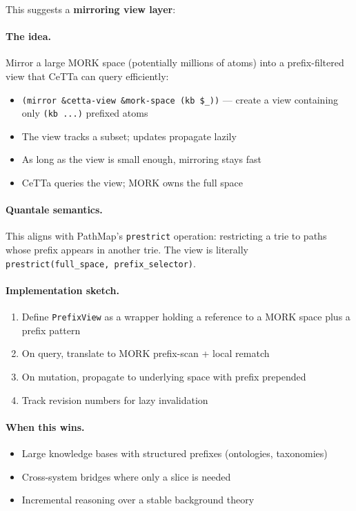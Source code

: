 \documentclass[11pt]{article}
\newcommand{\code}[1]{\texttt{#1}}
\newcommand{\PathMap}{\textup{PathMap}}
\newcommand{\MORK}{\textup{MORK}}
\begin{document}
This suggests a \textbf{mirroring view layer}:

\paragraph{The idea.}
Mirror a large \MORK{} space (potentially millions of atoms) into a
prefix-filtered view that CeTTa can query efficiently:
\begin{itemize}[nosep]
  \item \code{(mirror \&cetta-view \&mork-space (kb \$\_))} ---
    create a view containing only \code{(kb ...)} prefixed atoms
  \item The view tracks a subset; updates propagate lazily
  \item As long as the view is small enough, mirroring stays fast
  \item CeTTa queries the view; \MORK{} owns the full space
\end{itemize}

\paragraph{Quantale semantics.}
This aligns with \PathMap{}'s \code{prestrict} operation: restricting
a trie to paths whose prefix appears in another trie.  The view is
literally \code{prestrict(full\_space, prefix\_selector)}.

\paragraph{Implementation sketch.}
\begin{enumerate}[nosep]
  \item Define \code{PrefixView} as a wrapper holding a reference to
    a \MORK{} space plus a prefix pattern
  \item On query, translate to \MORK{} prefix-scan + local rematch
  \item On mutation, propagate to underlying space with prefix prepended
  \item Track revision numbers for lazy invalidation
\end{enumerate}

\paragraph{When this wins.}
\begin{itemize}[nosep]
  \item Large knowledge bases with structured prefixes (ontologies, taxonomies)
  \item Cross-system bridges where only a slice is needed
  \item Incremental reasoning over a stable background theory
\end{itemize}
\end{document}
